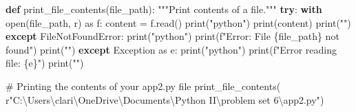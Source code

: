 \documentclass[
  letterpaper,
  DIV=11,
  numbers=noendperiod]{scrartcl}
\newenvironment{Shaded}{\begin{snugshade}}{\end{snugshade}}
\newcommand{\BuiltInTok}[1]{\textcolor[rgb]{0.00,0.23,0.31}{#1}}
\newcommand{\CommentTok}[1]{\textcolor[rgb]{0.37,0.37,0.37}{#1}}
\newcommand{\ControlFlowTok}[1]{\textcolor[rgb]{0.00,0.23,0.31}{\textbf{#1}}}
\newcommand{\ImportTok}[1]{\textcolor[rgb]{0.00,0.46,0.62}{#1}}
\newcommand{\KeywordTok}[1]{\textcolor[rgb]{0.00,0.23,0.31}{\textbf{#1}}}
\newcommand{\NormalTok}[1]{\textcolor[rgb]{0.00,0.23,0.31}{#1}}
\newcommand{\OperatorTok}[1]{\textcolor[rgb]{0.37,0.37,0.37}{#1}}
\newcommand{\PreprocessorTok}[1]{\textcolor[rgb]{0.68,0.00,0.00}{#1}}
\newcommand{\SpecialCharTok}[1]{\textcolor[rgb]{0.37,0.37,0.37}{#1}}
\newcommand{\SpecialStringTok}[1]{\textcolor[rgb]{0.13,0.47,0.30}{#1}}
\newcommand{\StringTok}[1]{\textcolor[rgb]{0.13,0.47,0.30}{#1}}
\newcommand{\VerbatimStringTok}[1]{\textcolor[rgb]{0.13,0.47,0.30}{#1}}
\begin{document}
\begin{Shaded}
\begin{Highlighting}[]
\KeywordTok{def}\NormalTok{ print\_file\_contents(file\_path):}
    \CommentTok{"""Print contents of a file."""}
    \ControlFlowTok{try}\NormalTok{:}
        \ControlFlowTok{with} \BuiltInTok{open}\NormalTok{(file\_path, }\StringTok{\textquotesingle{}r\textquotesingle{}}\NormalTok{) }\ImportTok{as}\NormalTok{ f:}
\NormalTok{            content }\OperatorTok{=}\NormalTok{ f.read()}
            \BuiltInTok{print}\NormalTok{(}\StringTok{"\textasciigrave{}\textasciigrave{}\textasciigrave{}python"}\NormalTok{)}
            \BuiltInTok{print}\NormalTok{(content)}
            \BuiltInTok{print}\NormalTok{(}\StringTok{"\textasciigrave{}\textasciigrave{}\textasciigrave{}"}\NormalTok{)}
    \ControlFlowTok{except} \PreprocessorTok{FileNotFoundError}\NormalTok{:}
        \BuiltInTok{print}\NormalTok{(}\StringTok{"\textasciigrave{}\textasciigrave{}\textasciigrave{}python"}\NormalTok{)}
        \BuiltInTok{print}\NormalTok{(}\SpecialStringTok{f"Error: File \textquotesingle{}}\SpecialCharTok{\{}\NormalTok{file\_path}\SpecialCharTok{\}}\SpecialStringTok{\textquotesingle{} not found"}\NormalTok{)}
        \BuiltInTok{print}\NormalTok{(}\StringTok{"\textasciigrave{}\textasciigrave{}\textasciigrave{}"}\NormalTok{)}
    \ControlFlowTok{except} \PreprocessorTok{Exception} \ImportTok{as}\NormalTok{ e:}
        \BuiltInTok{print}\NormalTok{(}\StringTok{"\textasciigrave{}\textasciigrave{}\textasciigrave{}python"}\NormalTok{)}
        \BuiltInTok{print}\NormalTok{(}\SpecialStringTok{f"Error reading file: }\SpecialCharTok{\{}\NormalTok{e}\SpecialCharTok{\}}\SpecialStringTok{"}\NormalTok{)}
        \BuiltInTok{print}\NormalTok{(}\StringTok{"\textasciigrave{}\textasciigrave{}\textasciigrave{}"}\NormalTok{)}


\CommentTok{\# Printing the contents of your app2.py file}
\NormalTok{print\_file\_contents(}
    \VerbatimStringTok{r"C:\textbackslash{}Users\textbackslash{}clari\textbackslash{}OneDrive\textbackslash{}Documents\textbackslash{}Python II\textbackslash{}problem set 6\textbackslash{}app2.py"}\NormalTok{)}
\end{Highlighting}
\end{Shaded}
\end{document}
